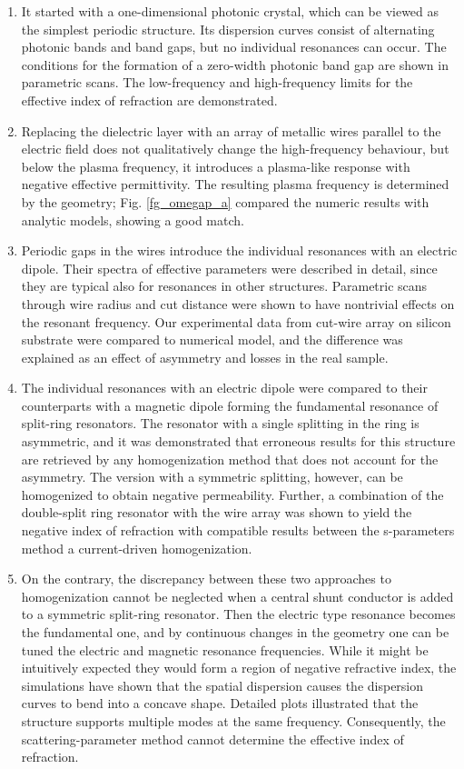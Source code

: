 \begin{enumerate}
\item{It started with a one-dimensional photonic crystal, which can be viewed as the simplest periodic structure. Its dispersion curves consist of alternating photonic bands and band gaps, but no individual resonances can occur. The conditions for the formation of a zero-width photonic band gap are shown in parametric scans. The low-frequency and high-frequency limits for the effective index of refraction are demonstrated.
} 
\item{Replacing the dielectric layer with an array of metallic wires parallel to the electric field does not qualitatively change the high-frequency behaviour, but below the plasma frequency, it introduces a plasma-like response with negative effective permittivity. The resulting plasma frequency is determined by the geometry; Fig. \ref{fg_omegap_a} compared the numeric results with analytic models, showing a good match.
} 
\item{Periodic gaps in the wires introduce the individual resonances with an electric dipole. Their spectra of effective parameters were described in detail, since they are typical also for resonances in other structures. Parametric scans through wire radius and cut distance were shown to have nontrivial effects on the resonant frequency. Our experimental data from cut-wire array on silicon substrate were compared to numerical model, and the difference was explained as an effect of asymmetry and losses in the real sample. 
} 
\item{The individual resonances with an electric dipole were compared to their counterparts with a magnetic dipole forming the fundamental resonance of split-ring resonators. The resonator with a single splitting in the ring is asymmetric, and it was demonstrated that  erroneous results for this structure are retrieved by any homogenization method that does not account for the asymmetry. The version with a symmetric splitting, however, can be homogenized to obtain negative permeability. Further, a combination of the double-split ring resonator with the wire array was shown to yield the negative index of refraction with compatible results between the s-parameters method a current-driven homogenization.
} 
\item{On the contrary, the discrepancy between these two approaches to homogenization cannot be neglected when a central shunt conductor is added to a symmetric split-ring resonator. Then the electric type resonance becomes the fundamental one, and by continuous changes in the geometry one  can be tuned the electric and magnetic resonance frequencies. While it might be intuitively expected they would form a region of negative refractive index, the simulations have shown that the spatial dispersion causes the dispersion curves to bend into a concave shape. Detailed plots illustrated that the structure supports multiple modes at the same frequency. Consequently, the scattering-parameter method cannot determine the effective index of refraction.
}
\end{enumerate}
